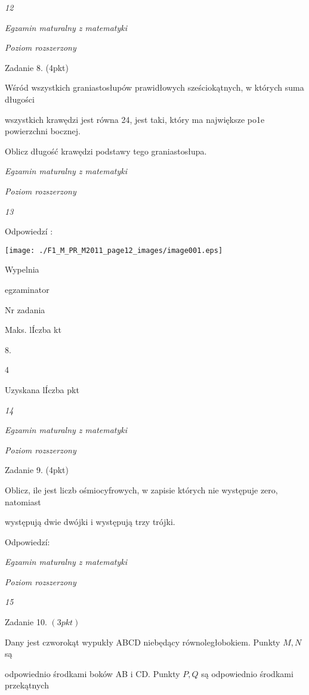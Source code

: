 \documentclass[a4paper,12pt]{article}
\begin{document}
{\it 12}

{\it Egzamin maturalny z matematyki}

{\it Poziom rozszerzony}

Zadanie 8. (4pkt)

Wśród wszystkich graniastosłupów prawidłowych sześciokątnych, w których suma długości

wszystkich krawędzi jest równa 24, jest taki, który ma największe po1e powierzchni bocznej.

Oblicz długość krawędzi podstawy tego graniastosłupa.





{\it Egzamin maturalny z matematyki}

{\it Poziom rozszerzony}

{\it 13}

Odpowiedzí :
\begin{center}
\texttt{[image: ./F1\_M\_PR\_M2011\_page12\_images/image001.eps]}
\end{center}
Wypelnia

egzaminator

Nr zadania

Maks. lÍczba kt

8.

4

Uzyskana lÍczba pkt





{\it 14}

{\it Egzamin maturalny z matematyki}

{\it Poziom rozszerzony}

Zadanie 9. (4pkt)

Oblicz, ile jest liczb ośmiocyfrowych, w zapisie których nie występuje zero, natomiast

występują dwie dwójki i występują trzy trójki.

Odpowiedzí:





{\it Egzamin maturalny z matematyki}

{\it Poziom rozszerzony}

{\it 15}

Zadanie 10. $(3pkt)$

Dany jest czworokąt wypukły ABCD niebędący równoległobokiem. Punkty $M, N$ są

odpowiednio środkami boków AB $\mathrm{i}$ CD. Punkty $P, Q$ są odpowiednio środkami przekątnych
\end{document}
